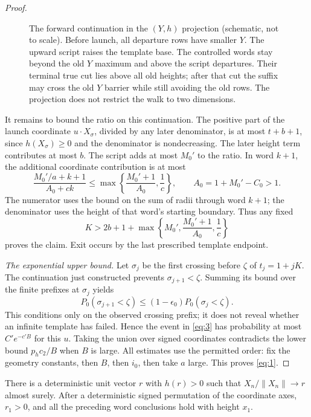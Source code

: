 \begin{proof}
\begin{figure}[tbp]
\centering

\caption{The forward continuation in the $(Y,h)$ projection
(schematic, not to scale). Before launch, all departure rows have smaller
$Y$. The upward script raises the template base. The controlled words
stay beyond the old $Y$ maximum and above the script departures. Their
terminal true cut lies above all old heights; after that cut the suffix
may cross the old $Y$ barrier while still avoiding the old rows. The
projection does not restrict the walk to two dimensions.}
\label{fig:forward-template}
\end{figure}

It remains to bound the ratio on this continuation. The positive part
of the launch coordinate $u\cdot X_\sigma$, divided by any later
denominator, is at most $t+b+1$, since $h(X_\sigma)\ge0$ and the
denominator is nondecreasing. The later height term contributes at most
$b$. The script adds at most $M_0'$ to the ratio. In word $k+1$, the
additional coordinate contribution is at most
\[
\frac{M_0'/a+k+1}{A_0+ck}
\le\max\left\{\frac{M_0'+1}{A_0},\frac1c\right\},
\qquad A_0=1+M_0'-C_0>1.
\]
The numerator uses the bound on the sum of radii through word $k+1$;
the denominator uses the height of that word's starting boundary.
Thus any fixed
\[
K>2b+1+\max\left\{M_0',\frac{M_0'+1}{A_0},\frac1c\right\}
\]
proves the claim. Exit occurs by the last prescribed template endpoint.

\smallskip\noindent\emph{The exponential upper bound.}
Let $\sigma_j$ be the first crossing before $\zeta$ of
$t_j=1+jK$. The continuation just constructed prevents
$\sigma_{j+1}<\zeta$. Summing its bound over the finite prefixes at
$\sigma_j$ yields
\[
P_0(\sigma_{j+1}<\zeta)
\le(1-\epsilon_0)P_0(\sigma_j<\zeta).
\]
This conditions only on the observed crossing prefix; it does not reveal
whether an infinite template has failed. Hence the event in
\eqref{eq:3} has probability at most $C'e^{-c'B}$ for this $u$.
Taking the union over signed coordinates contradicts the lower bound
$p_hc_2/B$ when $B$ is large. All estimates use the permitted order:
fix the geometry constants, then $B$, then $i_0$, then take $a$ large.
This proves \eqref{eq:1}.
\end{proof}

\begin{corollary}\label{geom-ray}
There is a deterministic unit vector \(r\) with \(h(r)>0\) such that
\(X_n/\|X_n\|\to r\) almost surely. After a deterministic signed
permutation of the coordinate axes, \(r_1>0\), and all the preceding
word conclusions hold with height \(x_1\).
\end{corollary}

